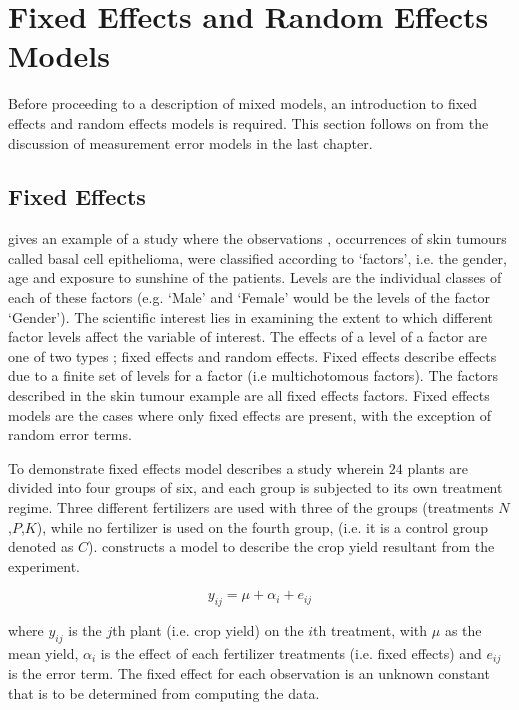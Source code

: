 \documentclass[12pt, a4paper]{report}
\begin{document}
\newpage

\section{Fixed Effects and Random Effects Models}
Before proceeding to a description of mixed models, an
introduction to fixed effects and random effects models is
required. This section follows on from the discussion of
measurement error models in the last chapter.

\subsection{Fixed Effects}
\citet{McCullSearle} gives an example of a study where the
observations , occurrences of skin tumours called basal cell
epithelioma, were classified according to `factors', i.e. the
gender, age and exposure to sunshine of the patients. Levels are
the individual classes of each of these factors (e.g. `Male' and
`Female' would be the levels of the factor `Gender'). The
scientific interest lies in examining the extent to which
different factor levels affect the variable of interest. The
effects of a level of a factor are one of two types ; fixed
effects and random effects. Fixed effects describe effects due to
a finite set of levels for a factor (i.e multichotomous factors).
The factors described in the skin tumour example are all fixed
effects factors. Fixed effects models are the cases where only
fixed effects are present, with the exception of random error
terms.

To demonstrate fixed effects model \citet{Searle} describes a
study wherein $24$ plants are divided into four groups of six, and
each group is subjected to its own treatment regime. Three
different fertilizers are used with three of the groups
(treatments $N$,$P$,$K$), while no fertilizer is used on the
fourth group, (i.e. it is a control group denoted as $C$).
\citet{Searle} constructs a model to describe the crop yield
resultant from the experiment.

\begin{equation}
y_{ij} = \mu + \alpha_{i} + e_{ij}
\end{equation}

where $y_{ij}$ is the $j$th plant (i.e. crop yield) on the $i$th
treatment, with $\mu$ as the mean yield, $\alpha_{i}$ is the
effect of each fertilizer treatments (i.e. fixed effects) and
$e_{ij}$ is the error term. The fixed effect for each observation
is an unknown constant that is to be determined from computing the
data.
\end{document}
